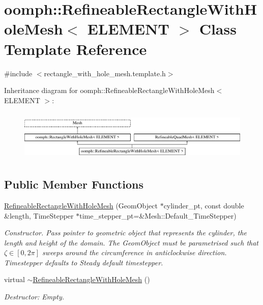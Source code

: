 \hypertarget{classoomph_1_1RefineableRectangleWithHoleMesh}{}\section{oomph\+:\+:Refineable\+Rectangle\+With\+Hole\+Mesh$<$ E\+L\+E\+M\+E\+NT $>$ Class Template Reference}
\label{classoomph_1_1RefineableRectangleWithHoleMesh}


{\ttfamily \#include $<$rectangle\+\_\+with\+\_\+hole\+\_\+mesh.\+template.\+h$>$}

Inheritance diagram for oomph\+:\+:Refineable\+Rectangle\+With\+Hole\+Mesh$<$ E\+L\+E\+M\+E\+NT $>$\+:\begin{figure}[H]
\begin{center}
\leavevmode
\includegraphics[height=2.456140cm]{classoomph_1_1RefineableRectangleWithHoleMesh}
\end{center}
\end{figure}
\subsection*{Public Member Functions}
\begin{DoxyCompactItemize}
\item 
\hyperlink{classoomph_1_1RefineableRectangleWithHoleMesh_a1b403fb6e31836c816e9a9cdfaa7703b}{Refineable\+Rectangle\+With\+Hole\+Mesh} (Geom\+Object $\ast$cylinder\+\_\+pt, const double \&length, Time\+Stepper $\ast$time\+\_\+stepper\+\_\+pt=\&Mesh\+::\+Default\+\_\+\+Time\+Stepper)
\begin{DoxyCompactList}\small\item\em Constructor. Pass pointer to geometric object that represents the cylinder, the length and height of the domain. The Geom\+Object must be parametrised such that $\zeta \in [0,2\pi]$ sweeps around the circumference in anticlockwise direction. Timestepper defaults to Steady default timestepper. \end{DoxyCompactList}\item 
virtual \hyperlink{classoomph_1_1RefineableRectangleWithHoleMesh_a1a04b6a5da21108a50934c4909625cf1}{$\sim$\+Refineable\+Rectangle\+With\+Hole\+Mesh} ()
\begin{DoxyCompactList}\small\item\em Destructor\+: Empty. \end{DoxyCompactList}\end{DoxyCompactItemize}
